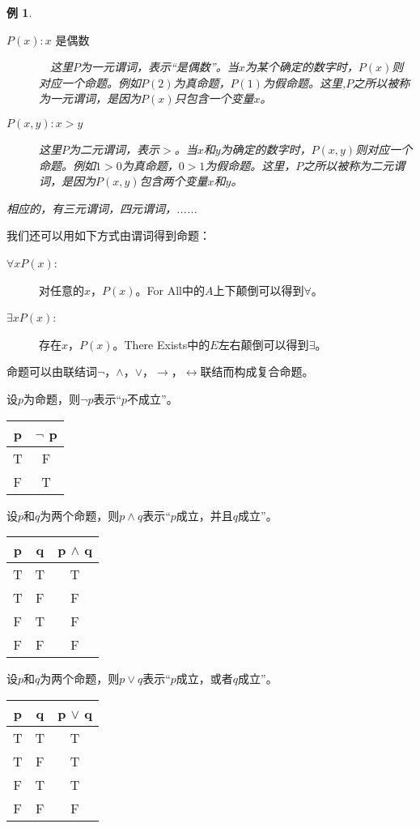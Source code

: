 \documentclass{article}
\newtheorem*{Example}{例}
\begin{document}
\begin{CJK}{UTF8}{gbsn}
  \begin{Example}\quad
    
    \begin{description}
    \item     [$P(x): x$ 是偶数]　这里$P$为一元谓词，表示“是偶数”。当$x$为某个确定的数字时，$P(x)$则对应一个命题。例如$P(2)$为真命题，$P(1)$为假命题。这里,$P$之所以被称为一元谓词，是因为$P(x)$只包含一个变量$x$。
    \item     [$P(x,y): x >y$]  这里$P$为二元谓词，表示$>$。当$x$和$y$为确定的数字时，$P(x,y)$则对应一个命题。例如$1>0$为真命题，$0>1$为假命题。这里，$P$之所以被称为二元谓词，是因为$P(x,y)$包含两个变量$x$和$y$。
    \end{description}
相应的，有三元谓词，四元谓词，......
\end{Example}

我们还可以用如下方式由谓词得到命题：

\begin{description}
\item [$\forall x P(x)$:] 对任意的$x$，$P(x)$。For All中的$A$上下颠倒可以得到$\forall$。
\item [$\exists x P(x)$:] 存在$x$，$P(x)$。There Exists中的$E$左右颠倒可以得到$\exists$。
\end{description}

命题可以由联结词$\lnot$，$\land$，$\lor$，$\to$，$\leftrightarrow$联结而构成复合命题。

设$p$为命题，则$\lnot p$表示“$p$不成立”。

 \begin{tabular}{c|c}
    p& $\lnot$ p\\
    \hline
    T&F\\
    F&T\\
  \end{tabular}

  设$p$和$q$为两个命题，则$p\land q$表示“$p$成立，并且$q$成立”。
  
  \begin{tabular}{cc|c}
    p& q& p $\land$ q\\
    \hline
    T&T&T\\
    T&F&F\\
    F&T&F\\
    F&F&F\\
  \end{tabular}

  设$p$和$q$为两个命题，则$p\lor q$表示“$p$成立，或者$q$成立”。
  
  \begin{tabular}{cc|c}
    p& q& p $\lor$ q\\
    \hline
    T&T&T\\
    T&F&T\\
    F&T&T\\
    F&F&F\\
  \end{tabular}


\end{CJK}
\end{document}

